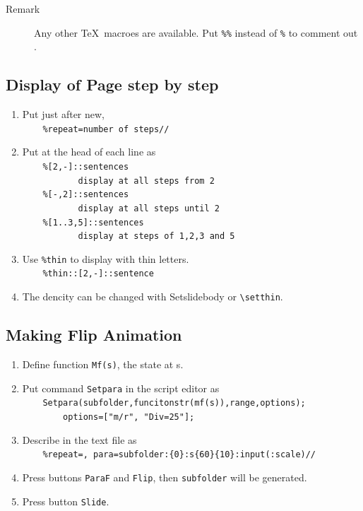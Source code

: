 \documentclass[papersize,a4paper,12pt]{article}
\begin{document}
\begin{description}
\item[Remark]Any other \TeX\ macroes are available. Put \verb|%%| instead of \verb|%| to comment out .
\end{description}


\subsection{Display of Page step by step}

\begin{enumerate}[1)]
\item Put just after new,\\
\verb|    %repeat=number of steps//|
\item Put at the head of each line as\\
\verb|    %[2,-]::sentences|\\
\verb|           display at all steps from 2|\\
\verb|    %[-,2]::sentences|\\
\verb|           display at all steps until 2|\\
\verb|    %[1..3,5]::sentences|\\
\verb|           display at steps of 1,2,3 and 5|
\item  Use \verb|%thin| to display with thin letters.\\
\verb|    %thin::[2,-]::sentence|
\item The dencity can be changed with Setslidebody or \verb|\setthin|.
\end{enumerate}

\subsection{Making Flip Animation}

\begin{enumerate}[1)]
\item Define function \verb|Mf(s)|, the state at s.
\item Put command \verb|Setpara| in the script editor as\\ 
\verb|    Setpara(subfolder,funcitonstr(mf(s)),range,options);|\\
\verb|        options=["m/r", "Div=25"];|
\item Describe in the text file as\\
\verb|    %repeat=, para=subfolder:{0}:s{60}{10}:input(:scale)//|
\item Press buttons \verb|ParaF| and \verb|Flip|, then \verb|subfolder| will be generated.
\item Press button \verb|Slide|.
\end{enumerate}
\end{document}
